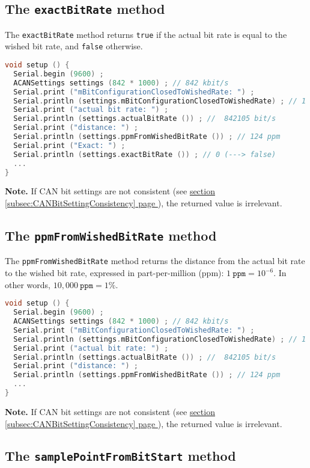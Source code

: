 \documentclass[10pt, a4paper, obeyspaces, openany]{extarticle}
\newcommand \subsectionLabel[2]{\subsection{#1}\label{subsec:#2}}
\newcommand\refSubsectionPage[1]{\hyperref[subsec:#1]{section \ref*{subsec:#1} page \pageref{subsec:#1}}}
\begin{document}
\subsectionLabel{The \texttt{exactBitRate} method}{exactBitRate}


The \texttt{exactBitRate} method returns \texttt{true} if the actual bit rate is equal to the wished bit rate, and \texttt{false} otherwise.

{ \small\begin{lstlisting}[language=c++]
void setup () {
  Serial.begin (9600) ;
  ACANSettings settings (842 * 1000) ; // 842 kbit/s
  Serial.print ("mBitConfigurationClosedToWishedRate: ") ;
  Serial.println (settings.mBitConfigurationClosedToWishedRate) ; // 1 (--> is true)
  Serial.print ("actual bit rate: ") ;
  Serial.println (settings.actualBitRate ()) ; //  842105 bit/s
  Serial.print ("distance: ") ;
  Serial.println (settings.ppmFromWishedBitRate ()) ; // 124 ppm
  Serial.print ("Exact: ") ;
  Serial.println (settings.exactBitRate ()) ; // 0 (---> false)
  ...
}
\end{lstlisting}}

{\bf Note. } If CAN bit settings are not consistent (see \refSubsectionPage{CANBitSettingConsistency}), the returned value is irrelevant.






\subsectionLabel{The \texttt{ppmFromWishedBitRate} method}{ppmFromWishedBitRate}


The \texttt{ppmFromWishedBitRate} method returns the distance from the actual bit rate to the wished bit rate, expressed in part-per-million (ppm): $1~\texttt{ppm} = 10^{-6}$. In other words, $10,000~\texttt{ppm}=1\%$.

{ \small\begin{lstlisting}[language=c++]
void setup () {
  Serial.begin (9600) ;
  ACANSettings settings (842 * 1000) ; // 842 kbit/s
  Serial.print ("mBitConfigurationClosedToWishedRate: ") ;
  Serial.println (settings.mBitConfigurationClosedToWishedRate) ; // 1 (--> is true)
  Serial.print ("actual bit rate: ") ;
  Serial.println (settings.actualBitRate ()) ; //  842105 bit/s
  Serial.print ("distance: ") ;
  Serial.println (settings.ppmFromWishedBitRate ()) ; // 124 ppm
  ...
}
\end{lstlisting}}

{\bf Note. } If CAN bit settings are not consistent (see \refSubsectionPage{CANBitSettingConsistency}), the returned value is irrelevant.






\subsectionLabel{The \texttt{samplePointFromBitStart} method}{samplePointFromBitStart}
\end{document}
